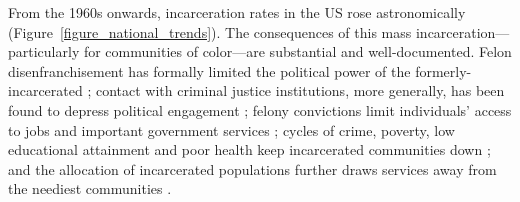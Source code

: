\documentclass[12pt]{article}
\begin{document}
From the 1960s onwards, incarceration rates in the US rose astronomically (Figure~\ref{figure_national_trends}).  The consequences of this mass incarceration---particularly for communities of color---are substantial and well-documented.  Felon disenfranchisement has formally limited the political power of the formerly-incarcerated ; contact with criminal justice institutions, more generally, has been found to depress political engagement ; felony convictions limit individuals' access to jobs and important government services ; cycles of crime, poverty, low educational attainment and poor health keep incarcerated communities down ; and the allocation of incarcerated populations further draws services away from the neediest communities .
\end{document}
